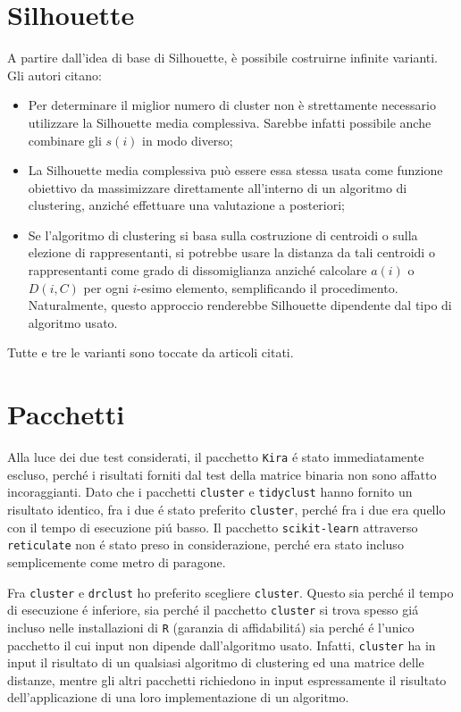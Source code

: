 \documentclass[12pt]{report}
\begin{document}
		\section{Silhouette}

			A partire dall'idea di base di Silhouette, è possibile costruirne
			infinite varianti. Gli autori citano:

			\begin{itemize}
				\item
				Per determinare il miglior numero di cluster non è strettamente
				necessario utilizzare la Silhouette media complessiva. Sarebbe
				infatti possibile anche combinare gli $s(i)$ in modo diverso;
				\item
				La Silhouette media complessiva può essere essa stessa usata
				come funzione obiettivo da massimizzare direttamente all'interno
				di un algoritmo di clustering, anziché effettuare una valutazione
				a posteriori;
				\item
				Se l'algoritmo di clustering si basa sulla costruzione di centroidi
				o sulla elezione di rappresentanti, si potrebbe usare la distanza
				da tali centroidi o rappresentanti come grado di dissomiglianza
				anziché calcolare $a(i)$ o $D(i, C)$ per ogni $i$-esimo elemento,
				semplificando il procedimento. Naturalmente, questo approccio
				renderebbe Silhouette dipendente dal tipo di algoritmo usato. 
			\end{itemize}

			Tutte e tre le varianti sono toccate da articoli citati.

		\section{Pacchetti}

			Alla luce dei due test considerati, il pacchetto \texttt{Kira}
			é stato immediatamente escluso, perché i risultati forniti dal
			test della matrice binaria non sono affatto incoraggianti.
			Dato che i pacchetti \texttt{cluster} e \texttt{tidyclust}
			hanno fornito un risultato identico, fra i due é stato preferito
			\texttt{cluster}, perché fra i due era quello con il tempo di
			esecuzione piú basso. Il pacchetto \texttt{scikit-learn}
			attraverso \texttt{reticulate} non é stato preso in
			considerazione, perché era stato incluso semplicemente
			come metro di paragone.

			Fra \texttt{cluster} e \texttt{drclust} ho preferito scegliere
			\texttt{cluster}. Questo sia perché il tempo di esecuzione é
			inferiore, sia perché il pacchetto \texttt{cluster} si trova
			spesso giá incluso nelle installazioni di \texttt{R} (garanzia
			di affidabilitá) sia perché é l'unico pacchetto il cui input
			non dipende dall'algoritmo usato. Infatti, \texttt{cluster}
			ha in input il risultato di un qualsiasi algoritmo di clustering
			ed una matrice delle distanze, mentre gli altri pacchetti
			richiedono in input espressamente il risultato dell'applicazione
			di una loro implementazione di un algoritmo.
\end{document}
